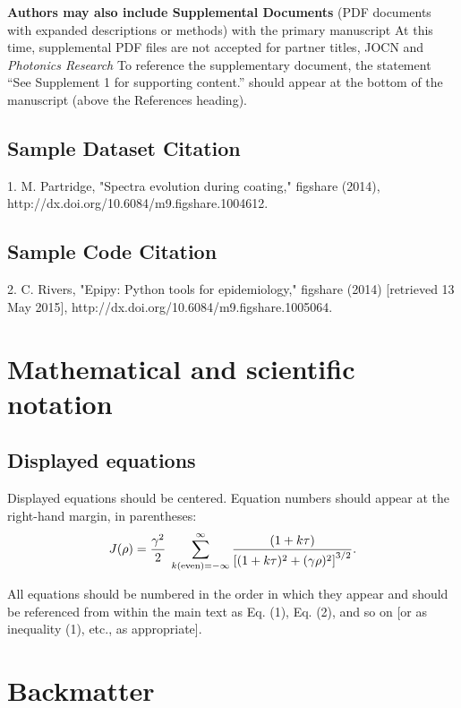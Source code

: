\documentclass{osa-article}
\begin{document}
\textbf{Authors may also include Supplemental Documents} (PDF documents with expanded descriptions or methods) with the primary manuscript
At this time, supplemental PDF files are not accepted for partner titles, JOCN and \emph{Photonics Research}
To reference the supplementary document, the statement ``See Supplement 1 for supporting content.'' should appear at the bottom of the manuscript (above the References heading).

\subsection{Sample Dataset Citation}

1. M. Partridge, "Spectra evolution during coating," figshare (2014), http://dx.doi.org/10.6084/m9.figshare.1004612.

\subsection{Sample Code Citation}

2. C. Rivers, "Epipy: Python tools for epidemiology," figshare (2014) [retrieved 13 May 2015], http://dx.doi.org/10.6084/m9.figshare.1005064.


\section{Mathematical and scientific notation}

\subsection{Displayed equations} Displayed equations should be centered.
Equation numbers should appear at the right-hand margin, in
parentheses:
\begin{equation}
J(\rho) =
 \frac{\gamma^2}{2} \; \sum_{k({\rm even}) = -\infty}^{\infty}
	\frac{(1 + k \tau)}{ \left[ (1 + k \tau)^2 + (\gamma  \rho)^2  \right]^{3/2} }.
\end{equation}

All equations should be numbered in the order in which they appear
and should be referenced  from within the main text as Eq. (1),
Eq. (2), and so on [or as inequality (1), etc., as appropriate].

\section{Backmatter}
\end{document}

